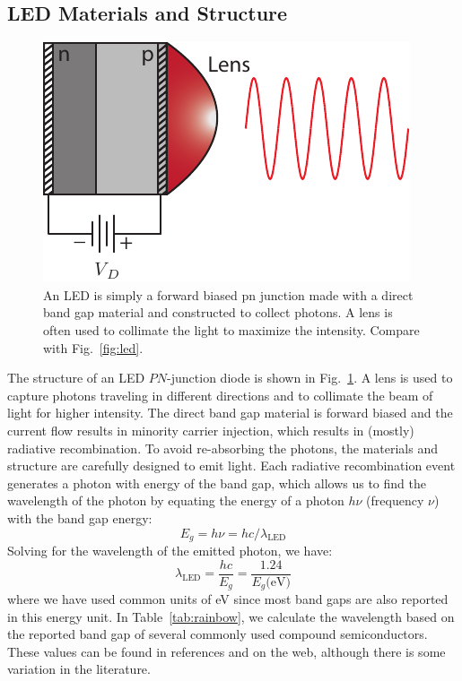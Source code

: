\subsection{LED Materials and Structure}
\begin{figure}[tb]
\centering
\includegraphics[width=.35\columnwidth]{led_struct}
\caption{An LED is simply a forward biased pn junction made with a direct band gap material and constructed to collect photons.  A lens is often used to collimate the light to maximize the intensity.  Compare with Fig.~\ref{fig:led}.}
\label{fig:led_struct}
\end{figure}
The structure of an LED $PN$-junction diode is shown in Fig.~\ref{fig:led_struct}.  A lens is used to capture photons traveling in different directions and to collimate the beam of light for higher intensity.    The direct band gap material is forward biased and the current flow results in minority carrier injection, which results in (mostly) radiative recombination.  To avoid re-absorbing the photons, the materials and structure are carefully designed to emit light. 
Each radiative recombination event generates a photon with energy of the band gap, which allows us to find the wavelength of the photon by equating the energy of a photon $h \nu$ (frequency $\nu$) with the band gap energy:
    \begin{equation} 
        E_g = h \nu = h c / \lambda_{\text{LED}} 
    \end{equation}
Solving for the wavelength of the emitted photon, we have:
    \begin{equation} 
        \lambda_{\text{LED}} = \frac{hc}{E_g} = \frac{1.24}{E_g \text{(eV)}}
    \end{equation}
where we have used common units of eV since most band gaps are also reported in this energy unit.  In Table~\ref{tab:rainbow}, we calculate the wavelength based on the reported band gap of several commonly used compound semiconductors.  These values can be found in references and on the web, although there is some variation in the literature.
